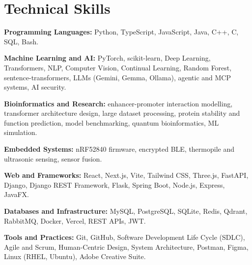 \documentclass[10pt,a4paper]{article}
\begin{document}
\section{Technical Skills}
\textbf{Programming Languages:} Python, TypeScript, JavaScript, Java, C++, C, SQL, Bash.\par
\textbf{Machine Learning and AI:} PyTorch, scikit-learn, Deep Learning, Transformers, NLP, Computer Vision, Continual Learning, Random Forest, sentence-transformers, LLMs (Gemini, Gemma, Ollama), agentic and MCP systems, AI security.\par
\textbf{Bioinformatics and Research:} enhancer-promoter interaction modelling, transformer architecture design, large dataset processing, protein stability and function prediction, model benchmarking, quantum bioinformatics, ML simulation.\par
\textbf{Embedded Systems:} nRF52840 firmware, encrypted BLE, thermopile and ultrasonic sensing, sensor fusion.\par
\textbf{Web and Frameworks:} React, Next.js, Vite, Tailwind CSS, Three.js, FastAPI, Django, Django REST Framework, Flask, Spring Boot, Node.js, Express, JavaFX.\par
\textbf{Databases and Infrastructure:} MySQL, PostgreSQL, SQLite, Redis, Qdrant, RabbitMQ, Docker, Vercel, REST APIs, JWT.\par
\textbf{Tools and Practices:} Git, GitHub, Software Development Life Cycle (SDLC), Agile and Scrum, Human-Centric Design, System Architecture, Postman, Figma, Linux (RHEL, Ubuntu), Adobe Creative Suite.
\end{document}

